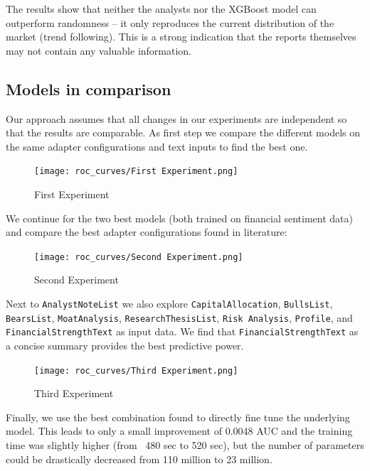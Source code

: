 \documentclass[conference]{IEEEtran}
\begin{document}
The results show that neither the analysts nor the XGBoost model can outperform randomness -- it only reproduces the current distribution of the market (trend following). This is a strong indication that the reports themselves may not contain any valuable information.


\subsection{Models in comparison}%
Our approach assumes that all changes in our experiments are independent so that the results are comparable. As first step we compare the different models on the same adapter configurations and text inputs to find the best one.

\begin{figure}[H]
    \centering
    \texttt{[image: roc\_curves/First Experiment.png]}
    \caption[First Experiment]{First Experiment}
    \label{fig:Firstexp}
\end{figure}

We continue for the two best models (both trained on financial sentiment data) and compare the best adapter configurations found in literature:

\begin{figure}[H]
    \centering
    \texttt{[image: roc\_curves/Second Experiment.png]}
    \caption[Second Experiment]{Second Experiment}
    \label{fig:Secondexp}
\end{figure}

Next to \texttt{AnalystNoteList} we also explore  \texttt{CapitalAllocation}, \texttt{BullsList}, \texttt{BearsList}, \texttt{MoatAnalysis}, \texttt{ResearchThesisList},  \texttt{Risk Analysis}, \texttt{Profile}, and  \texttt{FinancialStrengthText} as input data. We find that \texttt{FinancialStrengthText} as a concise summary provides the best predictive power.

\begin{figure}[H]
    \centering
    \texttt{[image: roc\_curves/Third Experiment.png]}
    \caption[Third Experiment]{Third Experiment}
    \label{fig:Thirdexp}
\end{figure}

Finally, we use the best combination found to directly fine tune the underlying model. This leads to only a small improvement of 0.0048 AUC and the training time was slightly higher (from ~480 sec to 520 sec), but the number of parameters could be drastically decreased from 110 million to 23 million.
\end{document}
